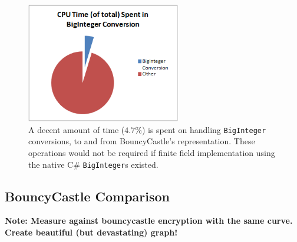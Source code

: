\begin{figure}[htb]
	\centering
	\includegraphics[width=0.6\textwidth]{performance/biginteger-conversion--relative-time}
	\caption{A decent amount of time (\(4.7\%\)) is spent on handling \texttt{BigInteger} conversions, to and from BouncyCastle's representation.
		These operations would not be required if finite field implementation using the native C\# \texttt{BigInteger}s existed.}
	\label{fig:biginteger-performance}
\end{figure}

\subsection{BouncyCastle Comparison}
\label{sec:performance_bouncycastle}
\textbf{Note: Measure against bouncycastle encryption with the same curve. Create beautiful (but devastating) graph!}